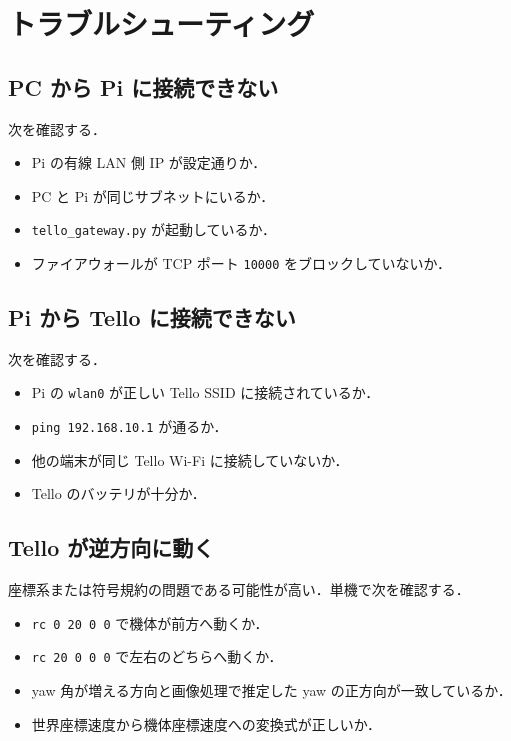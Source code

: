 \section{トラブルシューティング}
\label{sec:troubleshooting}

\subsection{PC から Pi に接続できない}

次を確認する．

\begin{itemize}
  \item Pi の有線 LAN 側 IP が設定通りか．
  \item PC と Pi が同じサブネットにいるか．
  \item \texttt{tello\_gateway.py} が起動しているか．
  \item ファイアウォールが TCP ポート \texttt{10000} をブロックしていないか．
\end{itemize}

\subsection{Pi から Tello に接続できない}

次を確認する．

\begin{itemize}
  \item Pi の \texttt{wlan0} が正しい Tello SSID に接続されているか．
  \item \texttt{ping 192.168.10.1} が通るか．
  \item 他の端末が同じ Tello Wi-Fi に接続していないか．
  \item Tello のバッテリが十分か．
\end{itemize}

\subsection{Tello が逆方向に動く}

座標系または符号規約の問題である可能性が高い．単機で次を確認する．

\begin{itemize}
  \item \texttt{rc 0 20 0 0} で機体が前方へ動くか．
  \item \texttt{rc 20 0 0 0} で左右のどちらへ動くか．
  \item yaw 角が増える方向と画像処理で推定した yaw の正方向が一致しているか．
  \item 世界座標速度から機体座標速度への変換式が正しいか．
\end{itemize}

